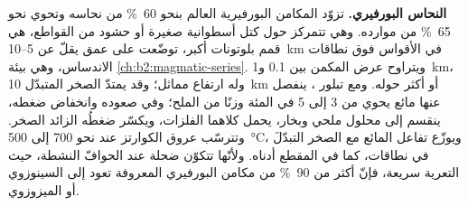 \textbf{النحاس البورفيري.} تزوّد المكامن البورفيرية العالم بنحو \qty{60}{\percent} من
نحاسه وتحوي نحو \qty{65}{\percent} من موارده. وهي تتمركز حول كتل
أسطوانية صغيرة أو حشود من القواطع، هي قمم بلوتونات أكبر، توضّعت على عمق يقلّ عن 5--\qty{10}{km}
في الأقواس فوق نطاقات الاندساس، وهي بيئة \cref{ch:b2:magmatic-series}. ويتراوح عرض المكمن بين 0.1
و\qty{1}{km}، وله ارتفاع مماثل؛ وقد يمتدّ الصخر المتبدّل \qty{10}{km} أو أكثر حوله.
ومع تبلور ، ينفصل عنها مائع يحوي من 3 إلى 5 في المئة وزنًا من الملح؛ وفي صعوده
وانخفاض ضغطه، ينقسم إلى محلول ملحي وبخار، يحمل كلاهما الفلزات، ويكسّر ضغطُه الزائد
الصخر. وتترسّب عروق الكوارتز عند نحو 700 إلى \qty{500}{\celsius}، ويوزّع
تفاعل المائع مع الصخر التبدّلَ في نطاقات، كما في المقطع أدناه. ولأنّها
تتكوّن ضحلة عند الحوافّ النشطة، حيث التعرية سريعة، فإنّ أكثر من \qty{90}{\percent} من مكامن
البورفيري المعروفة تعود إلى السينوزوي أو الميزوزوي.

